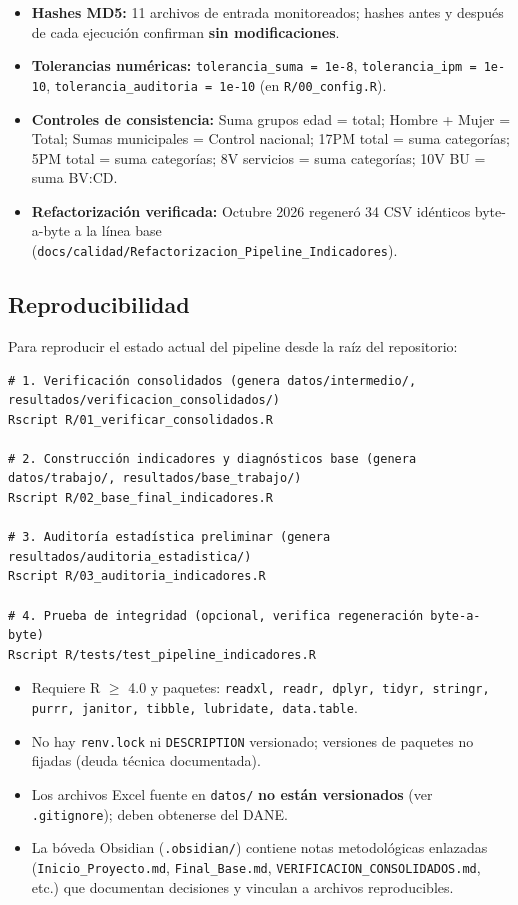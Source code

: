 \begin{itemize}
    \item \textbf{Hashes MD5:} 11 archivos de entrada monitoreados; hashes antes y después de cada ejecución confirman \textbf{sin modificaciones}.
    \item \textbf{Tolerancias numéricas:} \texttt{tolerancia\_suma = 1e-8}, \texttt{tolerancia\_ipm = 1e-10}, \texttt{tolerancia\_auditoria = 1e-10} (en \texttt{R/00\_config.R}).
    \item \textbf{Controles de consistencia:} Suma grupos edad = total; Hombre + Mujer = Total; Sumas municipales = Control nacional; 17PM total = suma categorías; 5PM total = suma categorías; 8V servicios = suma categorías; 10V BU = suma BV:CD.
    \item \textbf{Refactorización verificada:} Octubre 2026 regeneró 34 CSV idénticos byte-a-byte a la línea base (\texttt{docs/calidad/Refactorizacion\_Pipeline\_Indicadores}).
\end{itemize}

\subsection{Reproducibilidad}
\label{sec:reproducibilidad_practica}

Para reproducir el estado actual del pipeline desde la raíz del repositorio:

\begin{verbatim}
# 1. Verificación consolidados (genera datos/intermedio/, resultados/verificacion_consolidados/)
Rscript R/01_verificar_consolidados.R

# 2. Construcción indicadores y diagnósticos base (genera datos/trabajo/, resultados/base_trabajo/)
Rscript R/02_base_final_indicadores.R

# 3. Auditoría estadística preliminar (genera resultados/auditoria_estadistica/)
Rscript R/03_auditoria_indicadores.R

# 4. Prueba de integridad (opcional, verifica regeneración byte-a-byte)
Rscript R/tests/test_pipeline_indicadores.R
\end{verbatim}

\begin{itemize}
    \item Requiere R $\ge$ 4.0 y paquetes: \texttt{readxl, readr, dplyr, tidyr, stringr, purrr, janitor, tibble, lubridate, data.table}.
    \item No hay \texttt{renv.lock} ni \texttt{DESCRIPTION} versionado; versiones de paquetes no fijadas (deuda técnica documentada).
    \item Los archivos Excel fuente en \texttt{datos/} \textbf{no están versionados} (ver \texttt{.gitignore}); deben obtenerse del DANE.
    \item La bóveda Obsidian (\texttt{.obsidian/}) contiene notas metodológicas enlazadas (\texttt{Inicio\_Proyecto.md}, \texttt{Final\_Base.md}, \texttt{VERIFICACION\_CONSOLIDADOS.md}, etc.) que documentan decisiones y vinculan a archivos reproducibles.
\end{itemize}



